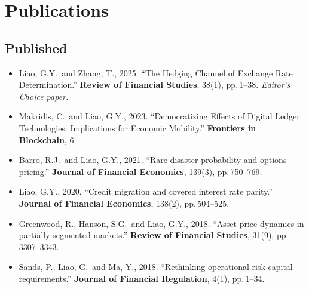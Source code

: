 \documentclass[10.5pt]{article}
\newenvironment{pubs}{\begin{itemize}[leftmargin=0pt,itemindent=0pt,labelsep=0pt,label={},itemsep=3pt,topsep=2pt]}{\end{itemize}}
\begin{document}
\section{Publications}
\subsection{Published}
\begin{pubs}
\item Liao, G.Y.\ and Zhang, T., 2025. ``The Hedging Channel of Exchange Rate Determination.'' \textbf{Review of Financial Studies}, 38(1), pp.\,1--38. \emph{Editor's Choice paper.}
\item Makridis, C.\ and Liao, G.Y., 2023. ``Democratizing Effects of Digital Ledger Technologies: Implications for Economic Mobility.'' \textbf{Frontiers in Blockchain}, 6.
\item Barro, R.J.\ and Liao, G.Y., 2021. ``Rare disaster probability and options pricing.'' \textbf{Journal of Financial Economics}, 139(3), pp.\,750--769.
\item Liao, G.Y., 2020. ``Credit migration and covered interest rate parity.'' \textbf{Journal of Financial Economics}, 138(2), pp.\,504--525.
\item Greenwood, R., Hanson, S.G.\ and Liao, G.Y., 2018. ``Asset price dynamics in partially segmented markets.'' \textbf{Review of Financial Studies}, 31(9), pp.\,3307--3343.
\item Sands, P., Liao, G.\ and Ma, Y., 2018. ``Rethinking operational risk capital requirements.'' \textbf{Journal of Financial Regulation}, 4(1), pp.\,1--34.
\end{pubs}
\end{document}

